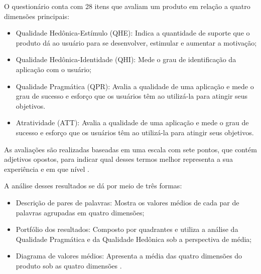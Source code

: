 \begin{description}
\item O questionário conta com 28 itens que avaliam um produto em relação a quatro dimensões principais:
      \begin{itemize}
          \item Qualidade Hedônica-Estímulo (QHE): Indica a quantidade de suporte que o produto dá ao usuário para se 
          desenvolver, estimular e aumentar a motivação;

          \item Qualidade Hedônica-Identidade (QHI): Mede o grau de identificação da aplicação com o usuário;

          \item Qualidade Pragmática (QPR): Avalia a qualidade de uma aplicação e mede o grau de sucesso e esforço que 
          os usuários têm ao utilizá-la para atingir seus objetivos.

          \item Atratividade (ATT): Avalia a qualidade de uma aplicação e mede o grau de sucesso e esforço que os 
          usuários têm ao utilizá-la para atingir seus objetivos.
      \end{itemize}
\end{description}

As avaliações são realizadas baseadas em uma escala com sete pontos, que contém adjetivos opostos, para indicar qual desses 
termos melhor representa a sua experiência e em que nível \cite{natashatayana2015} \cite{hassenzahl2003}.

\begin{description}
    \item A análise desses resultados se dá por meio de três formas: 
          \begin{itemize}
              \item Descrição de pares de palavras: Mostra os valores médios de cada par de palavras agrupadas em quatro dimensões;
    
              \item Portfólio dos resultados: Composto por quadrantes e utiliza a análise da Qualidade Pragmática e da Qualidade 
              Hedônica sob a perspectiva de média;
    
              \item Diagrama de valores médios: Apresenta a média das quatro dimensões do produto sob as quatro dimensões \cite{providencia2021}.
          \end{itemize}
\end{description}

